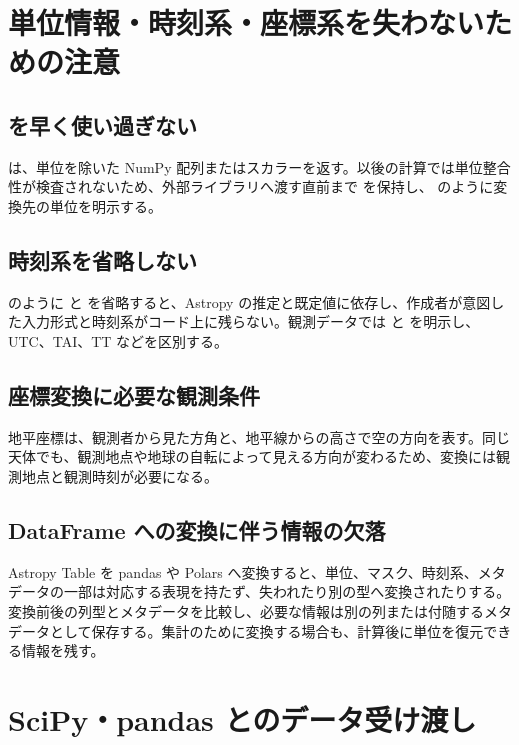\section{単位情報・時刻系・座標系を失わないための注意}

\subsection{ を早く使い過ぎない}

 は、単位を除いた NumPy 配列またはスカラーを返す。以後の計算では単位整合性が検査されないため、外部ライブラリへ渡す直前まで  を保持し、 のように変換先の単位を明示する。

\subsection{時刻系を省略しない}

 のように  と  を省略すると、Astropy の推定と既定値に依存し、作成者が意図した入力形式と時刻系がコード上に残らない。観測データでは  と  を明示し、UTC、TAI、TT などを区別する。

\subsection{座標変換に必要な観測条件}

地平座標は、観測者から見た方角と、地平線からの高さで空の方向を表す。同じ天体でも、観測地点や地球の自転によって見える方向が変わるため、変換には観測地点と観測時刻が必要になる。

\subsection{DataFrame への変換に伴う情報の欠落}

Astropy Table を pandas や Polars へ変換すると、単位、マスク、時刻系、メタデータの一部は対応する表現を持たず、失われたり別の型へ変換されたりする。変換前後の列型とメタデータを比較し、必要な情報は別の列または付随するメタデータとして保存する。集計のために変換する場合も、計算後に単位を復元できる情報を残す。

\section{SciPy・pandas とのデータ受け渡し}

